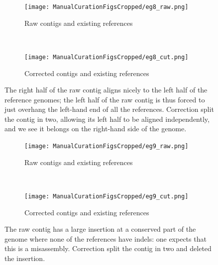 \documentclass{article}
\begin{document}
\begin{landscape}
\begin{figure}[!h]
\centering
\begin{subfigure}{1.3\textwidth}
\texttt{[image: ManualCurationFigsCropped/eg8\_raw.png]}
\caption{Raw contigs and existing references}
\end{subfigure}
\vspace*{1cm} \\
\begin{subfigure}{1.3\textwidth}
\texttt{[image: ManualCurationFigsCropped/eg8\_cut.png]}
\caption{Corrected contigs and existing references}
\end{subfigure}
\caption{The right half of the raw contig aligns nicely to the left half of the reference genomes; the left half of the raw contig is thus forced to just overhang the left-hand end of all the references.
Correction split the contig in two, allowing its left half to be aligned independently, and we see it belongs on the right-hand side of the genome.}
\end{figure}

\begin{figure}[!h]
\centering
\begin{subfigure}{1.3\textwidth}
\texttt{[image: ManualCurationFigsCropped/eg9\_raw.png]}
\caption{Raw contigs and existing references}
\end{subfigure}
\vspace*{1cm} \\
\begin{subfigure}{1.3\textwidth}
\texttt{[image: ManualCurationFigsCropped/eg9\_cut.png]}
\caption{Corrected contigs and existing references}
\end{subfigure}
\caption{The raw contig has a large insertion at a conserved part of the genome where none of the references have indels: one expects that this is a misassembly.
Correction split the contig in two and deleted the insertion.}
\end{figure}


\end{landscape}
\end{document}
